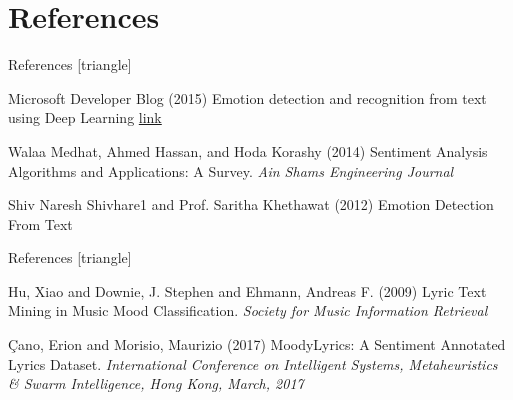 \documentclass[xcolor=dvipsnames]{beamer}
\begin{document}
\section{References}
\begin{frame}{References}
[triangle]
 \begin{thebibliography}{99} %
 Microsoft Developer Blog (2015)
\newblock Emotion detection and recognition from text using Deep Learning
\newblock \href{https://www.microsoft.com/developerblog/2015/11/29/emotion-detection-and-recognition-from-text-using-deep-learning/}{link}

 Walaa Medhat, Ahmed Hassan, and Hoda Korashy (2014)
\newblock Sentiment Analysis Algorithms and Applications: A Survey.
\newblock \emph{Ain Shams Engineering Journal}

 Shiv Naresh Shivhare1 and Prof. Saritha Khethawat (2012)
\newblock Emotion Detection From Text

\end{thebibliography}

\end{frame}

\begin{frame}{References}
[triangle]
 \begin{thebibliography}{99} %

Hu, Xiao and Downie, J. Stephen and Ehmann, Andreas F. (2009)
\newblock Lyric Text Mining in Music Mood Classification.
\newblock \emph{Society for Music Information Retrieval}

Çano, Erion and Morisio, Maurizio  (2017)
\newblock  MoodyLyrics: A Sentiment Annotated Lyrics Dataset.
\newblock \emph{International Conference on Intelligent Systems, Metaheuristics \& Swarm Intelligence, Hong Kong, March, 2017}

\end{thebibliography}

\end{frame}
\end{document}
